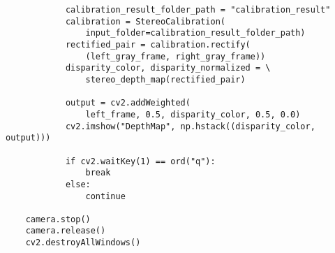 \begin{verbatim}
            calibration_result_folder_path = "calibration_result"
            calibration = StereoCalibration(
                input_folder=calibration_result_folder_path)
            rectified_pair = calibration.rectify(
                (left_gray_frame, right_gray_frame))
            disparity_color, disparity_normalized = \
                stereo_depth_map(rectified_pair)

            output = cv2.addWeighted(
                left_frame, 0.5, disparity_color, 0.5, 0.0)
            cv2.imshow("DepthMap", np.hstack((disparity_color, output)))

            if cv2.waitKey(1) == ord("q"):
                break
            else:
                continue

    camera.stop()
    camera.release()
    cv2.destroyAllWindows()
\end{verbatim}
